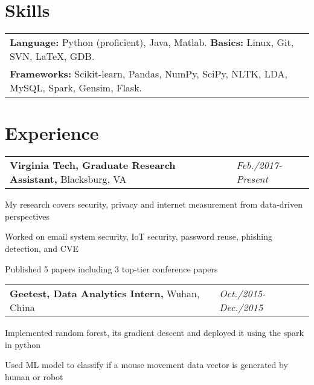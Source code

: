 \documentclass[a4paper,10pt]{article}
\newenvironment{packed_itemize}{
\begin{list}{\labelitemi}{\leftmargin=2em}
\setlength{\itemsep}{0pt}
\setlength{\parskip}{0pt}
\setlength{\parsep}{0pt}
\setlength{\headsep}{0pt}
\setlength{\topskip}{0pt}
\setlength{\topmargin}{0pt}
\setlength{\topsep}{0pt}
\setlength{\partopsep}{0pt}
}{\end{list}}
\begin{document}
\section{Skills}

\vspace{-0.2cm}

\begin{tabular}{p{17.5cm}}
\textbf{Language:} Python (proficient), Java, Matlab. \textbf{Basics:} Linux, Git, SVN, \LaTeX, GDB. \\
\textbf{Frameworks:} Scikit-learn, Pandas, NumPy, SciPy, NLTK, LDA, MySQL, Spark, Gensim, Flask. \\
\end{tabular}






\section{Experience}
\vspace{-0.2cm}

\begin{tabular}{p{15cm}p{3cm}}
\textbf{Virginia Tech, Graduate Research Assistant,} Blacksburg, VA & \emph{Feb./2017-Present} \\
\end{tabular}

\begin{packed_itemize}
\item My research covers security, privacy and internet measurement from data-driven perspectives  \\
\item Worked on email system security, IoT security, password reuse, phishing detection, and CVE  \\
\item Published 5 papers including 3 top-tier conference papers \\
\end{packed_itemize}



\begin{tabular}{p{15cm}p{3cm}}
\textbf{Geetest, Data Analytics Intern,} Wuhan, China & \emph{Oct./2015-Dec./2015} \\
\end{tabular}

\begin{packed_itemize}
\item Implemented random forest, its gradient descent and deployed it using the spark in python
\item Used ML model to classify if a mouse movement data vector is generated by human or robot \\
\end{packed_itemize}
\end{document}
